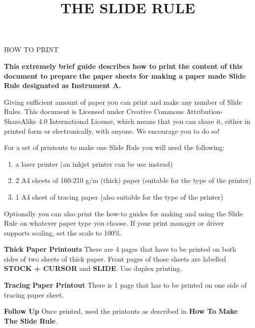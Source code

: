 
\newcommand{\makefulltitle}{How To Print The Slide Rule }



\title{\fontsize{60}{60}\selectfont THE SLIDE RULE}
\preauthor{}\postauthor{}\author{}
\predate{}\postdate{}\date{}


  \begin{center}
    \headingfont\fontsize{20}{20}\selectfont HOW TO PRINT
  \end{center}

  {\let\newpage\relax\maketitle}%
  \nosection{}
  \large\textbf{\makeperex This extremely brief guide describes how to print the content of this document to prepare the paper sheets for making a paper made Slide Rule designated as Instrument A.}

  \begin{multicols*}{3}
  \normalsize{

  Giving sufficient amount of paper you can print and make any number of Slide Rules. This document is Licensed under Creative Commons Attribution-ShareAlike 4.0 International License, which means that you can share it, either in printed form or electronically, with anyone. We encourage you to do so!

  For a set of printouts to make one Slide Rule you will need the following:
    \begin{enumerate}
      \setlength{\parskip}{0pt}
      \setlength{\parsep}{0pt}
      \item a laser printer (an inkjet printer can be use instead)
      \item 2 A4 sheets of 160-210 g/m (thick) paper (suitable for the type of the printer)
      \item 1 A4 sheet of tracing paper (also suitable for the type of the printer)
    \end{enumerate}

  Optionally you can also print the how-to guides for making and using the Slide Rule on whatever paper type you choose. If your print manager or driver supports scaling, set the scale to 100\%.

  \textbf{Thick Paper Printouts}
There are 4 pages that have to be printed on both sides of two sheets of thick paper. Front pages of those sheets are labelled \textbf{STOCK + CURSOR} and \textbf{SLIDE}. Use duplex printing.

  \textbf{Tracing Paper Printout}
There is 1 page that has to be printed on one side of tracing paper sheet. 

  \textbf{Follow Up}
Once printed, used the printouts as described in \textbf{How To Make The Slide Rule}.

  }
  \end{multicols*}
  


